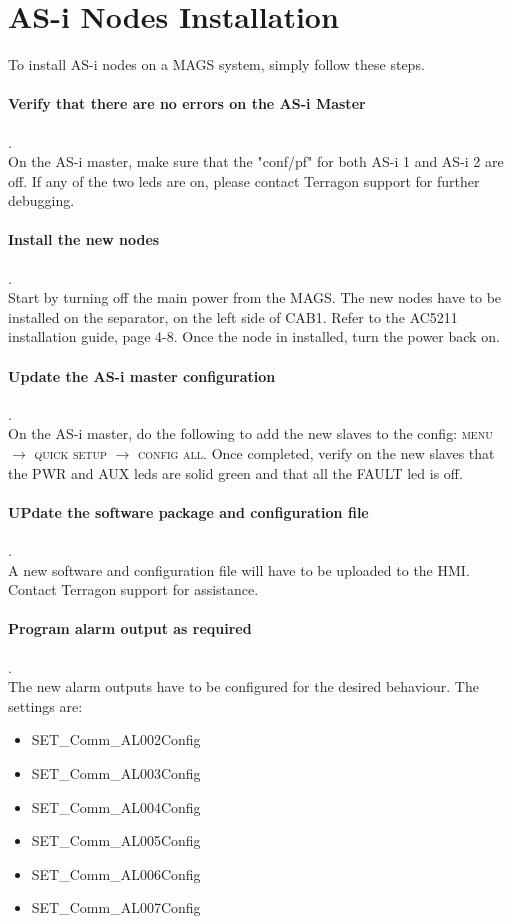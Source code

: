 \section{AS-i Nodes Installation}
To install AS-i nodes on a MAGS system, simply follow these steps.

\paragraph{Verify that there are no errors on the AS-i Master}.\\
On the AS-i master, make sure that the "conf/pf" for both AS-i 1 and AS-i 2 are off. If any of the two leds are on, please contact Terragon support for further debugging.

\paragraph{Install the new nodes}.\\
Start by turning off the main power from the MAGS. The new nodes have to be installed on the separator, on the left side of CAB1. Refer to the AC5211 installation guide, page 4-8. Once the node in installed, turn the power back on.

\paragraph{Update the AS-i master configuration}.\\
On the AS-i master, do the following to add the new slaves to the config: \textsc{menu} $\rightarrow$ \textsc{quick setup} $\rightarrow$ \textsc{config all}. Once completed, verify on the new slaves that the PWR and AUX leds are solid green and that all the FAULT led is off.

\paragraph{UPdate the software package and configuration file}.\\
A new software and configuration file will have to be uploaded to the HMI. Contact Terragon support for assistance.

\paragraph{Program alarm output as required}.\\
The new alarm outputs have to be configured for the desired behaviour. The settings are:
\begin{itemize}
    \item SET\_Comm\_AL002Config
    \item SET\_Comm\_AL003Config
    \item SET\_Comm\_AL004Config
    \item SET\_Comm\_AL005Config
    \item SET\_Comm\_AL006Config
    \item SET\_Comm\_AL007Config
\end{itemize}

